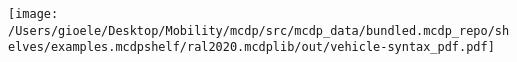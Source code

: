 
    \texttt{[image: /Users/gioele/Desktop/Mobility/mcdp/src/mcdp\_data/bundled.mcdp\_repo/shelves/examples.mcdpshelf/ral2020.mcdplib/out/vehicle-syntax\_pdf.pdf]}
    